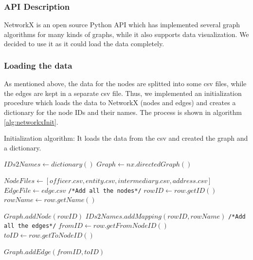 \documentclass[sigconf, nonacm]{acmart}
\begin{document}
\subsubsection{API Description}
NetworkX is an open source Python API which has implemented several graph algorithms for many kinds of graphs, while it also supports data visualization. We decided to use it as it could load the data completely.

\subsubsection{Loading the data}
As mentioned above, the data for the nodes are splitted into some csv files, while the edges are kept in a separate csv file. Thus, we implemented an initialization procedure which loads the data to NetworkX (nodes and edges) and creates a dictionary for the node IDs and their names. The process is shown in algorithm \ref{alg:networkxInit}.
\begin{algorithm}
\caption{Initialization algorithm: It loads the data from the csv and created the graph and a dictionary.}\label{alg:networkxInit}
\begin{algorithmic}

\State $IDs2Names \gets dictionary()$
\State $Graph \gets nx.directedGraph()$

\State $NodeFiles \gets [officer.csv,entity.csv,intermediary.csv,address.csv]$
\State $EdgeFile \gets edge.csv$
\State
\State \texttt{/*Add all the nodes*/}
        \State $rowID \gets row.getID()$
        \State $rowName \gets row.getName()$
        
        \State $Graph.addNode(rowID)$
        \State $IDs2Names.addMapping(rowID, rowName)$
    \EndFor
\EndFor
\State
\State \texttt{/*Add all the edges*/}
    \State $fromID \gets row.getFromNodeID()$
    \State $toID \gets row.getToNodeID()$
    
    \State $Graph.addEdge(fromID, toID)$
\EndFor

\end{algorithmic}
\end{algorithm}
\end{document}
